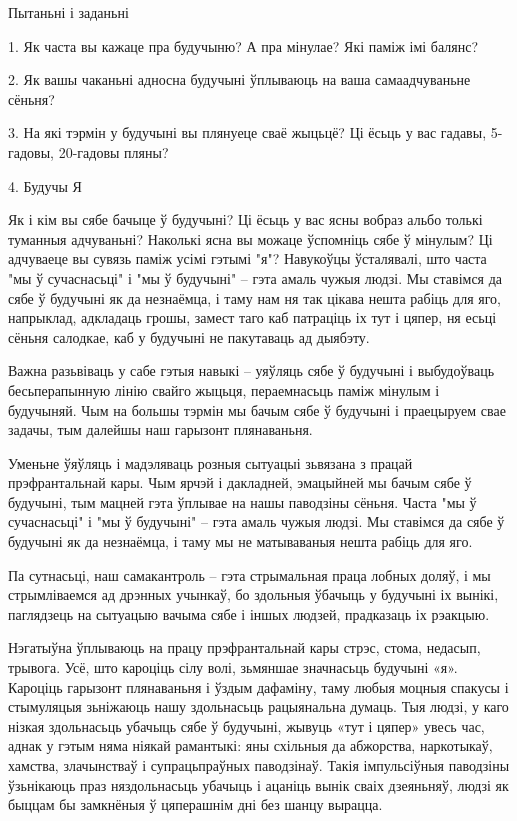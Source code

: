 Пытаньні і заданьні

1. Як часта вы кажаце пра будучыню? А пра мінулае? Які паміж імі балянс?

2. Як вашы чаканьні адносна будучыні ўплываюць на ваша самаадчуваньне сёньня?

3. На які тэрмін у будучыні вы плянуеце сваё жыцьцё? Ці ёсьць у вас гадавы, 5-гадовы, 20-гадовы пляны?


4. Будучы Я

Як і кім вы сябе бачыце ў будучыні? Ці ёсьць у вас ясны вобраз альбо толькі туманныя адчуваньні? Наколькі ясна вы можаце ўспомніць сябе ў мінулым? Ці адчуваеце вы сувязь паміж усімі гэтымі "я"? Навукоўцы ўсталявалі, што часта "мы ў сучаснасьці" і "мы ў будучыні" – гэта амаль чужыя людзі. Мы ставімся да сябе ў будучыні як да незнаёмца, і таму нам ня так цікава нешта рабіць для яго, напрыклад, адкладаць грошы, замест таго каб патраціць іх тут і цяпер, ня есьці сёньня салодкае, каб у будучыні не пакутаваць ад дыябэту.

Важна разьвіваць у сабе гэтыя навыкі – уяўляць сябе ў будучыні і выбудоўваць бесьперапынную лінію свайго жыцьця, пераемнасьць паміж мінулым і будучыняй. Чым на большы тэрмін мы бачым сябе ў будучыні і праецыруем свае задачы, тым далейшы наш гарызонт плянаваньня.

Уменьне ўяўляць і мадэляваць розныя сытуацыі зьвязана з працай прэфрантальнай кары. Чым ярчэй і дакладней, эмацыйней мы бачым сябе ў будучыні, тым мацней гэта ўплывае на нашы паводзіны сёньня. Часта "мы ў сучаснасьці" і "мы ў будучыні" – гэта амаль чужыя людзі. Мы ставімся да сябе ў будучыні як да незнаёмца, і таму мы не матываваныя нешта рабіць для яго.

Па сутнасьці, наш самакантроль – гэта стрымальная праца лобных доляў, і мы стрымліваемся ад дрэнных учынкаў, бо здольныя ўбачыць у будучыні іх вынікі, паглядзець на сытуацыю вачыма сябе і іншых людзей, прадказаць іх рэакцыю.

Нэгатыўна ўплываюць на працу прэфрантальнай кары стрэс, стома, недасып, трывога. Усё, што кароціць сілу волі, зьмяншае значнасьць будучыні «я». Кароціць гарызонт плянаваньня і ўздым дафаміну, таму любыя моцныя спакусы і стымуляцыя зьніжаюць нашу здольнасьць рацыянальна думаць. Тыя людзі, у каго нізкая здольнасьць убачыць сябе ў будучыні, жывуць «тут і цяпер» увесь час, аднак у гэтым няма ніякай рамантыкі: яны схільныя да абжорства, наркотыкаў, хамства, злачынстваў і супрацьпраўных паводзінаў. Такія імпульсіўныя паводзіны ўзьнікаюць праз няздольнасьць убачыць і ацаніць вынік сваіх дзеяньняў, людзі як быццам бы замкнёныя ў цяперашнім дні без шанцу вырацца.

